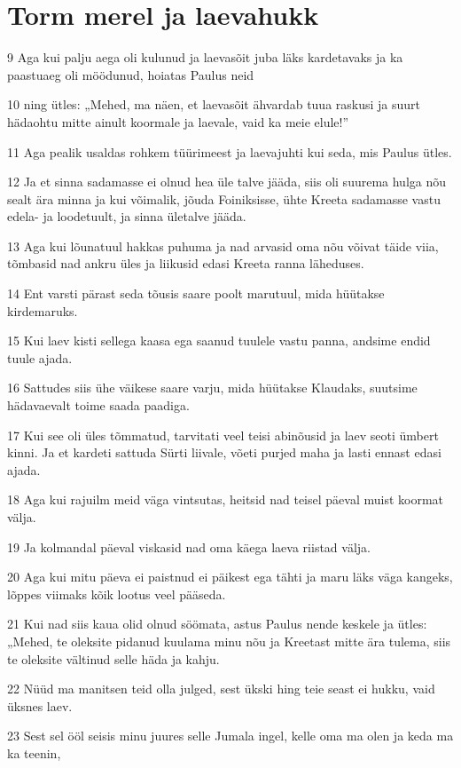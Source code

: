 \section*{Torm merel ja laevahukk}

\par 9 Aga kui palju aega oli kulunud ja laevasõit juba läks kardetavaks ja ka paastuaeg oli möödunud, hoiatas Paulus neid
\par 10 ning ütles: „Mehed, ma näen, et laevasõit ähvardab tuua raskusi ja suurt hädaohtu mitte ainult koormale ja laevale, vaid ka meie elule!”
\par 11 Aga pealik usaldas rohkem tüürimeest ja laevajuhti kui seda, mis Paulus ütles.
\par 12 Ja et sinna sadamasse ei olnud hea üle talve jääda, siis oli suurema hulga nõu sealt ära minna ja kui võimalik, jõuda Foiniksisse, ühte Kreeta sadamasse vastu edela- ja loodetuult, ja sinna ületalve jääda.
\par 13 Aga kui lõunatuul hakkas puhuma ja nad arvasid oma nõu võivat täide viia, tõmbasid nad ankru üles ja liikusid edasi Kreeta ranna läheduses.
\par 14 Ent varsti pärast seda tõusis saare poolt marutuul, mida hüütakse kirdemaruks.
\par 15 Kui laev kisti sellega kaasa ega saanud tuulele vastu panna, andsime endid tuule ajada.
\par 16 Sattudes siis ühe väikese saare varju, mida hüütakse Klaudaks, suutsime hädavaevalt toime saada paadiga.
\par 17 Kui see oli üles tõmmatud, tarvitati veel teisi abinõusid ja laev seoti ümbert kinni. Ja et kardeti sattuda Sürti liivale, võeti purjed maha ja lasti ennast edasi ajada.
\par 18 Aga kui rajuilm meid väga vintsutas, heitsid nad teisel päeval muist koormat välja.
\par 19 Ja kolmandal päeval viskasid nad oma käega laeva riistad välja.
\par 20 Aga kui mitu päeva ei paistnud ei päikest ega tähti ja maru läks väga kangeks, lõppes viimaks kõik lootus veel pääseda.
\par 21 Kui nad siis kaua olid olnud söömata, astus Paulus nende keskele ja ütles: „Mehed, te oleksite pidanud kuulama minu nõu ja Kreetast mitte ära tulema, siis te oleksite vältinud selle häda ja kahju.
\par 22 Nüüd ma manitsen teid olla julged, sest ükski hing teie seast ei hukku, vaid üksnes laev.
\par 23 Sest sel ööl seisis minu juures selle Jumala ingel, kelle oma ma olen ja keda ma ka teenin,
